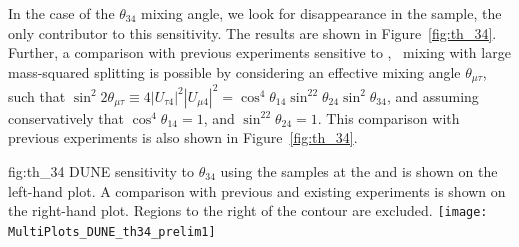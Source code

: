 
In the case of the $\theta_{34}$ mixing angle, we look for disappearance in the  sample, the only contributor to this sensitivity. The results are shown in Figure~\ref{fig:th_34}. Further, a comparison with previous experiments sensitive to \numu, \nutau~mixing with large mass-squared splitting is possible by considering an effective mixing angle $\theta_{\mu\tau}$, such that $\sin^2{2\theta_{\mu\tau}}\equiv 4|U_{\tau4}|^2|U_{\mu 4}|^2=\cos^4\theta_{14}\sin^22\theta_{24}\sin^2\theta_{34}$, and assuming conservatively that $\cos^4\theta_{14}=1$, and $\sin^22\theta_{24}=1$. This comparison with previous experiments is also shown in Figure~\ref{fig:th_34}.
\begin{dunefigure} {fig:th_34} 
{DUNE sensitivity to $\theta_{34}$ using the  samples at the  and  is shown on the left-hand plot. A comparison with previous and existing experiments is shown on the right-hand plot. Regions to the right of the contour are excluded.}
\texttt{[image: MultiPlots\_DUNE\_th34\_prelim1]}
\end{dunefigure}


